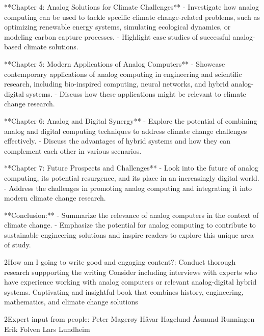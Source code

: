 \documentclass{article}
\begin{document}
**Chapter 4: Analog Solutions for Climate Challenges**
- Investigate how analog computing can be used to tackle specific climate change-related problems, such as optimizing renewable energy systems, simulating ecological dynamics, or modeling carbon capture processes.
- Highlight case studies of successful analog-based climate solutions.

**Chapter 5: Modern Applications of Analog Computers**
- Showcase contemporary applications of analog computing in engineering and scientific research, including bio-inspired computing, neural networks, and hybrid analog-digital systems.
- Discuss how these applications might be relevant to climate change research.

**Chapter 6: Analog and Digital Synergy**
- Explore the potential of combining analog and digital computing techniques to address climate change challenges effectively.
- Discuss the advantages of hybrid systems and how they can complement each other in various scenarios.

**Chapter 7: Future Prospects and Challenges**
- Look into the future of analog computing, its potential resurgence, and its place in an increasingly digital world.
- Address the challenges in promoting analog computing and integrating it into modern climate change research.

**Conclusion:**
- Summarize the relevance of analog computers in the context of climate change.
- Emphasize the potential for analog computing to contribute to sustainable engineering solutions and inspire readers to explore this unique area of study.

\h2{How am I going to write good and engaging content?:}
Conduct thorough research suppporting the writing
Consider including interviews with experts who have experience working with analog computers or relevant analog-digital hybrid systems. 
Captivating and insightful book that combines history, engineering, mathematics, and climate change solutions

\h2{Expert input from people:}
Peter Magerøy
Håvar Hagelund
Åsmund Runningen
Erik Folven
Lars Lundheim
\end{document}
